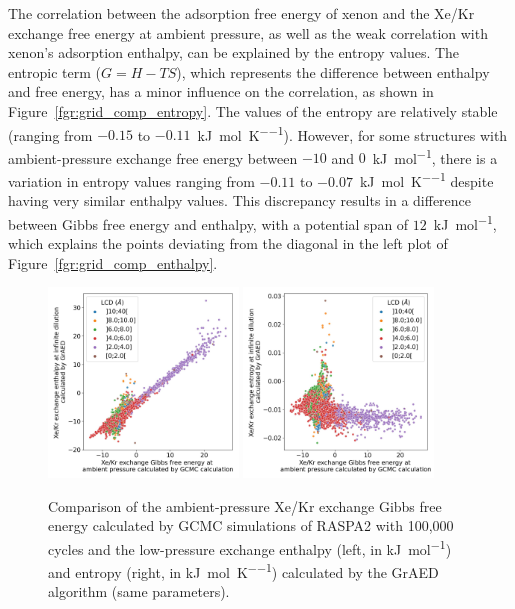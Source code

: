 \documentclass[main]{subfiles}
\begin{document}
The correlation between the adsorption free energy of xenon and the Xe/Kr exchange free energy at ambient pressure, as well as the weak correlation with xenon's adsorption enthalpy, can be explained by the entropy values. The entropic term ($G=H-TS$), which represents the difference between enthalpy and free energy, has a minor influence on the correlation, as shown in Figure~\ref{fgr:grid_comp_entropy}. The values of the entropy are relatively stable (ranging from $-0.15$ to $-0.11$~\si{\kilo\joule\per\mole\per\kelvin}). However, for some structures with ambient-pressure exchange free energy between $-10$ and $0$~\si{\kilo\joule\per\mole}, there is a variation in entropy values ranging from $-0.11$ to $-0.07$~\si{\kilo\joule\per\mole\per\kelvin} despite having very similar enthalpy values. This discrepancy results in a difference between Gibbs free energy and enthalpy, with a potential span of $12$~\si{\kilo\joule\per\mole}, which explains the points deviating from the diagonal in the left plot of Figure~\ref{fgr:grid_comp_enthalpy}.

\begin{figure}[ht]
  \centering
    \includegraphics[width=0.45\textwidth]{figures/3-fastsim/G_2080_vs_H_grid_overview.jpg}
    \hfill
    \includegraphics[width=0.45\textwidth]{figures/3-fastsim/G_2080_vs_S_grid_overview.jpg}
    \caption{Comparison of the ambient-pressure Xe/Kr exchange Gibbs free energy calculated by GCMC simulations of RASPA2 with 100,000 cycles and the low-pressure exchange enthalpy (left, in \si{\kilo\joule\per\mole}) and entropy (right, in \si{\kilo\joule\per\mole\per\kelvin}) calculated by the GrAED algorithm (same parameters).}\label{fgr:grid_comp_exc}
\end{figure}
\end{document}
